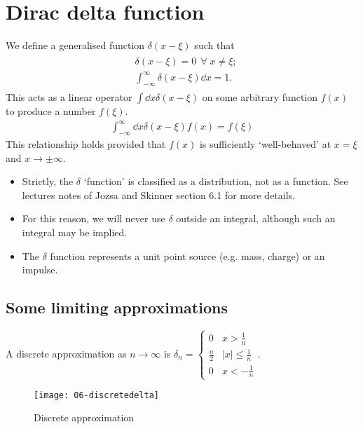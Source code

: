 \section{Dirac delta function}

\begin{definition}
	We define a generalised function $\delta(x - \xi)$ such that
	\begin{align}
		\begin{aligned} \label{eq:6.1}
			&\delta(x-\xi) = 0 \ \ \forall \; x \neq \xi; \\
			&\int_{-\infty}^\infty \delta(x-\xi) \dd{x} = 1.
		\end{aligned} 	
	\end{align} 
	This acts as a linear operator $\int \dd{x} \delta(x - \xi)$ on some arbitrary function $f(x)$ to produce a number $f(\xi)$.
	\begin{align} \label{eq:6.2}
		\int_{-\infty}^\infty \dd{x} \delta(x-\xi) f(x) = f(\xi)
	\end{align}
	This relationship holds provided that $f(x)$ is sufficiently `well-behaved' at $x=\xi$ and $x\to\pm \infty$.
\end{definition}

\begin{note}
	\begin{itemize}
		\item Strictly, the $\delta$ `function' is classified as a distribution, not as a function.
		See lectures notes of Jozsa and Skinner section 6.1 for more details.
		\item For this reason, we will never use $\delta$ outside an integral, although such an integral may be implied.
		\item The $\delta$ function represents a unit point source (e.g. mass, charge) or an impulse.
	\end{itemize} 
\end{note}

\subsection{Some limiting approximations}

A discrete approximation as $n \to \infty$ is $\delta_n = \begin{cases}
	0 & x > \frac{1}{n} \\
	\frac{n}{2} & |x| \leq \frac{1}{n} \\
	0 & x < - \frac{1}{n}
\end{cases}$.
\begin{figure}[h] 
    \centering 
    \texttt{[image: 06-discretedelta]} 
	\caption{Discrete approximation}
\end{figure}

